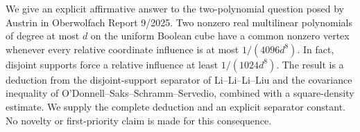 We give an explicit affirmative answer to the two-polynomial question posed by
Austrin in Oberwolfach Report 9/2025. Two nonzero real multilinear polynomials
of degree at most \(d\) on the uniform Boolean cube have a common nonzero
vertex whenever every relative coordinate influence is at most
\(1/(4096d^8)\). In fact, disjoint supports force a relative influence at least
\(1/(1024d^8)\). The result is a deduction from the disjoint-support separator
of Li--Li--Li--Liu and the covariance inequality of
O'Donnell--Saks--Schramm--Servedio, combined with a square-density estimate.
We supply the complete deduction and an explicit separator constant.
No novelty or first-priority claim is made for this consequence.

